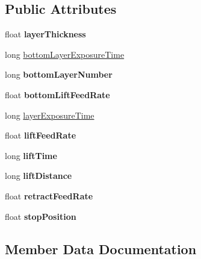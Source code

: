 \subsection*{Public Attributes}
\begin{DoxyCompactItemize}
\item 
\mbox{\label{structprint__prameter_abd09065a3d907abd26ddb981525ad35a}} 
float {\bfseries layer\+Thickness}
\item 
long \hyperlink{structprint__prameter_a4cad4458c035a54cbde08c36227bb82a}{bottom\+Layer\+Exposure\+Time}
\item 
\mbox{\label{structprint__prameter_a2ea1a3922216a9d1fbdab1abfc37e5fa}} 
long {\bfseries bottom\+Layer\+Number}
\item 
\mbox{\label{structprint__prameter_a87ad0abc66a28d11effc6e13dc3ca1a0}} 
float {\bfseries bottom\+Lift\+Feed\+Rate}
\item 
long \hyperlink{structprint__prameter_a132ea30d7e46206117d917db4e2d1bcf}{layer\+Exposure\+Time}
\item 
\mbox{\label{structprint__prameter_ab37375be2b8efeddf2d78316763f7523}} 
float {\bfseries lift\+Feed\+Rate}
\item 
\mbox{\label{structprint__prameter_a8b69e9f209d8b1d9e2cfd175916a5717}} 
long {\bfseries lift\+Time}
\item 
\mbox{\label{structprint__prameter_a70afbfab45c84387bf81d4f6e27bb825}} 
long {\bfseries lift\+Distance}
\item 
\mbox{\label{structprint__prameter_a842278c540f5ec9784150c2ecff0472d}} 
float {\bfseries retract\+Feed\+Rate}
\item 
\mbox{\label{structprint__prameter_a524cf4dd9639bafd6926d3fc2fe29071}} 
float {\bfseries stop\+Position}
\end{DoxyCompactItemize}


\subsection{Member Data Documentation}
\mbox{\label{structprint__prameter_a4cad4458c035a54cbde08c36227bb82a}} 
